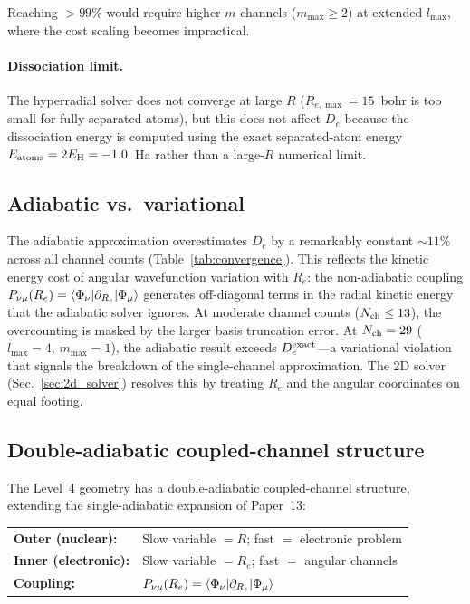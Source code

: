 \documentclass[aps,pra,twocolumn,superscriptaddress,longbibliography]{revtex4-2}
\begin{document}
Reaching $> 99\%$ would require higher $m$ channels ($m_{\max} \ge 2$)
at extended $l_{\max}$, where the cost scaling becomes impractical.

\paragraph{Dissociation limit.}
The hyperradial solver does not converge at large $R$
($R_{e,\max} = 15$~bohr is too small for fully separated atoms),
but this does not affect $D_e$ because the dissociation energy is
computed using the exact separated-atom energy
$E_{\rm atoms} = 2E_{\rm H} = -1.0$~Ha rather than a large-$R$
numerical limit.

\subsection{Adiabatic vs.\ variational}

The adiabatic approximation overestimates $D_e$ by a remarkably
constant ${\sim}11\%$ across all channel counts
(Table~\ref{tab:convergence}).  This reflects the kinetic energy cost
of angular wavefunction variation with $R_e$: the non-adiabatic
coupling $P_{\nu\mu}(R_e) =
\braket{\Phi_\nu|\partial_{R_e}|\Phi_\mu}$ generates off-diagonal
terms in the radial kinetic energy that the adiabatic solver ignores.
At moderate channel counts ($N_{\rm ch} \le 13$), the overcounting is
masked by the larger basis truncation error.  At $N_{\rm ch} = 29$
($l_{\max}=4$, $m_{\max}=1$), the adiabatic result exceeds
$D_e^{\rm exact}$---a variational violation that signals the
breakdown of the single-channel approximation.
The 2D solver (Sec.~\ref{sec:2d_solver}) resolves this by treating
$R_e$ and the angular coordinates on equal footing.

\subsection{Double-adiabatic coupled-channel structure}

The Level~4 geometry has a double-adiabatic coupled-channel structure,
extending the single-adiabatic expansion of Paper~13:

\medskip
\noindent
\begin{tabular}{ll}
\textbf{Outer (nuclear):} & Slow variable $= R$;
  fast $=$ electronic problem \\
\textbf{Inner (electronic):} & Slow variable $= R_e$;
  fast $=$ angular channels \\
\textbf{Coupling:} & $P_{\nu\mu}(R_e) =
  \braket{\Phi_\nu|\partial_{R_e}|\Phi_\mu}$
\end{tabular}
\end{document}
